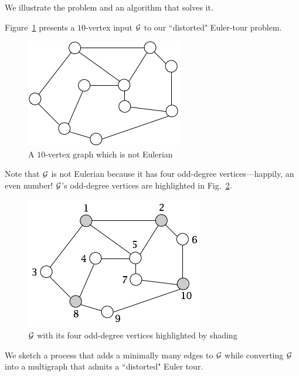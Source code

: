 \medskip

We illustrate the problem and an algorithm that solves it.

\smallskip

Figure~\ref{fig:EulerianInitial} presents a $10$-vertex input $\mbox{$\cal G$}$ to our ``distorted" Euler-tour problem. 
\begin{figure}[hbt]
\begin{center}
       \includegraphics[scale=0.35]{FiguresGraph/EulerienInitial}
       \caption{A $10$-vertex graph which is not Eulerian}
              \label{fig:EulerianInitial}
\end{center}
\end{figure}
Note that $\mbox{$\cal G$}$ is not Eulerian because it has four odd-degree vertices---happily, an even number!  $\mbox{$\cal G$}$'s odd-degree vertices are highlighted in Fig.~\ref{fig:EulerianVodd}.
\begin{figure}[hbt]
\begin{center}
       \includegraphics[scale=0.35]{FiguresGraph/EulerianVodd}
       \caption{$\mbox{$\cal G$}$ with its four odd-degree vertices highlighted by shading}
              \label{fig:EulerianVodd}
\end{center}
\end{figure}

\smallskip

We sketch a process that adds a minimally many edges to $\mbox{$\cal G$}$ while converting $\mbox{$\cal G$}$ into a multigraph that admits a ``distorted" Euler tour. 

